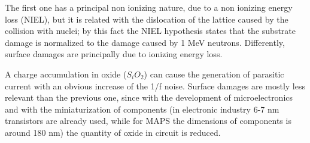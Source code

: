     The first one has a principal non ionizing nature, due to a non ionizing energy loss (NIEL), but it is related with the dislocation of the lattice caused by the collision with nuclei; by this fact the NIEL hypothesis states that the substrate damage is normalized to the damage caused by 1 MeV neutrons. Differently, surface damages are principally due to ionizing energy loss.

    A charge accumulation in oxide ($S_iO_2$) can cause the generation of parasitic current with an obvious increase of the 1/f noise. Surface damages are mostly less relevant than the previous one, since with the development of microelectronics and with the miniaturization of components (in electronic industry 6-7 nm transistors are already used, while for MAPS the dimensions of components is around 180 nm) the quantity of oxide in circuit is reduced.


